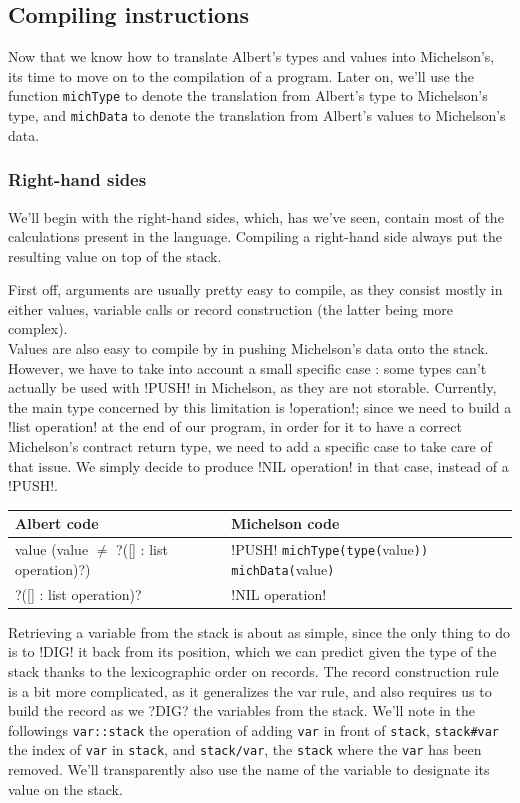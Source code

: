 \documentclass{report}
\begin{document}
\subsection{Compiling instructions}

Now that we know how to translate Albert's types and values into Michelson's, its time to move on to the compilation of a program. Later on, we'll use the function \texttt{michType} to denote the translation from Albert's type to Michelson's type, and \texttt{michData} to denote the translation from Albert's values to Michelson's data.

\subsubsection{Right-hand sides}

We'll begin with the right-hand sides, which, has we've seen, contain most of the calculations present in the language. Compiling a right-hand side always put the resulting value on top of the stack.

First off, arguments are usually pretty easy to compile, as they consist mostly in either values, variable calls or record construction (the latter being more complex).\\

Values are also easy to compile by in pushing Michelson's data onto the stack. However, we have to take into account a small specific case : some types can't actually be used with !PUSH! in Michelson, as they are not storable. Currently, the main type concerned by this limitation is !operation!; since we need to build a !list operation! at the end of our program, in order for it to have a correct Michelson's contract return type, we need to add a specific case to take care of that issue. We simply decide to produce !NIL operation! in that case, instead of a !PUSH!.

{\small
\begin{longtable}{l|l}
  Albert code & Michelson code\\
  \hline
  value (value $\neq$ ?([] : list operation)?) & !PUSH! \texttt{michType(type(}value\texttt{))} \texttt{michData(}value\texttt{)} \\
  ?([] : list operation)? & !NIL operation!
\end{longtable}}

Retrieving a variable from the stack is about as simple, since the only thing to do is to !DIG! it back from its position, which we can predict given the type of the stack thanks to the lexicographic order on records. The record construction rule is a bit more complicated, as it generalizes the var rule, and also requires us to build the record as we ?DIG? the variables from the stack. We'll note in the followings \texttt{var::stack} the operation of adding \texttt{var} in front of \texttt{stack}, \texttt{stack\#var} the index of \texttt{var} in \texttt{stack}, and \texttt{stack/var}, the \texttt{stack} where the \texttt{var} has been removed. We'll transparently also use the name of the variable to designate its value on the stack.
\end{document}
